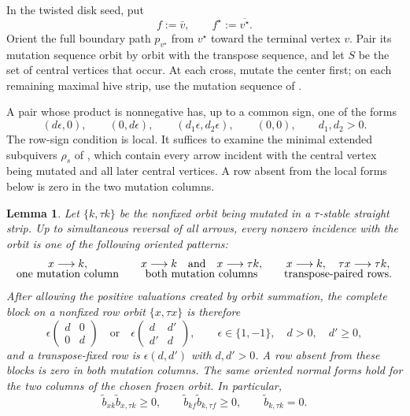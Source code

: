 \documentclass[11pt]{amsart}
\newtheorem{lemma}[theorem]{Lemma}
\theoremstyle{definition}
\theoremstyle{remark}
\begin{document}
In the twisted disk seed, put
\[ f:=\bar v, \qquad f^{\star}:=\overline{v^{\star}}. \]
Orient the full boundary path $p_{v^{\star}}$ from $v^{\star}$ toward the
terminal vertex $v$.  Pair its mutation sequence orbit by orbit with the
transpose sequence, and let $S$ be the set of central vertices that occur.
At each cross, mutate the center first; on each remaining maximal hive strip,
use the mutation sequence of \cite[Lemma~6.15]{FeiKroneckerII}.

A pair whose product is nonnegative has, up to a common sign, one of
the forms
\[ (d\epsilon,0),\qquad(0,d\epsilon),\qquad (d_1\epsilon,d_2\epsilon),\qquad(0,0), \qquad d_1,d_2>0. \]
The row-sign condition is local.  It suffices to examine the minimal
extended subquivers $\rho_s$ of \cite[Lemmas~6.15--6.16]{FeiKroneckerII},
which contain every arrow incident with the central vertex being mutated
and all later central vertices.  A row absent from the local forms below is
zero in the two mutation columns.

\begin{lemma}\label{lem:straight-strip-local-matrix}
Let $\{k,\tau k\}$ be the nonfixed orbit being mutated in a
$\tau$-stable straight strip.  Up to simultaneous reversal of all
arrows, every nonzero incidence with the orbit is one of the
following oriented patterns:
\begin{equation*}
\begin{array}{c@{\qquad}c@{\qquad}c}
 x\longrightarrow k,
 &x\longrightarrow k\quad\text{and}\quad x\longrightarrow\tau k,
 &x\longrightarrow k,\quad \tau x\longrightarrow\tau k,\\[-1mm]
 \text{one mutation column}
 &\text{both mutation columns}
 &\text{transpose-paired rows}.
\end{array}
\end{equation*}
After allowing the positive valuations created by orbit summation, the
complete block on a nonfixed row orbit $\{x,\tau x\}$ is therefore
\begin{equation}
 \epsilon
 \begin{pmatrix}d&0\\0&d\end{pmatrix}
 \quad\text{or}\quad
 \epsilon
 \begin{pmatrix}d&d'\\d'&d\end{pmatrix},
 \qquad
 \epsilon\in\{1,-1\},\quad d>0,\quad d'\ge0,
 \label{eq:straight-strip-orbit-blocks}
\end{equation}
and a transpose-fixed row is $\epsilon(d,d')$ with $d,d'>0$.  A
row absent from these blocks is zero in both mutation columns.  The same
oriented normal forms hold for the two columns of the chosen frozen orbit.
In particular,
\begin{equation}
 \widetilde b_{xk}\widetilde b_{x,\tau k}\ge0,
 \qquad
 \widetilde b_{k f}\widetilde b_{k,\tau f}\ge0,
 \qquad
 \widetilde b_{k,\tau k}=0.
 \label{eq:straight-strip-sign-conclusion}
\end{equation}
\end{lemma}
\end{document}
